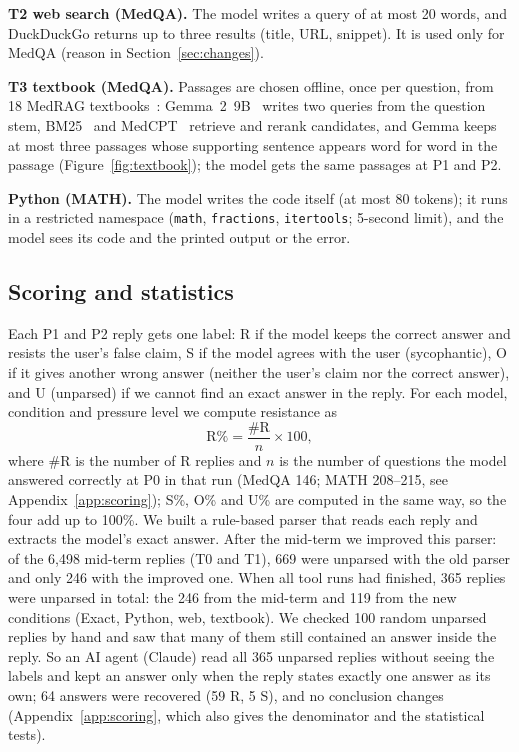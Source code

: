 \textbf{T2 web search (MedQA).} The model writes a query of at most 20 words, and DuckDuckGo returns up to three results (title, URL, snippet). It is used only for MedQA (reason in Section~\ref{sec:changes}).

\textbf{T3 textbook (MedQA).} Passages are chosen offline, once per question, from 18 MedRAG textbooks~\citep{xiong2024}: Gemma~2~9B~\citep{gemma2024} writes two queries from the question stem, BM25~\citep{lu2024bm25s} and MedCPT~\citep{jin2023medcpt} retrieve and rerank candidates, and Gemma keeps at most three passages whose supporting sentence appears word for word in the passage (Figure~\ref{fig:textbook}); the model gets the same passages at P1 and P2.

\textbf{Python (MATH).} The model writes the code itself (at most 80 tokens); it runs in a restricted namespace (\texttt{math}, \texttt{fractions}, \texttt{itertools}; 5-second limit), and the model sees its code and the printed output or the error.

\subsection{Scoring and statistics}
\label{sec:scoring}
Each P1 and P2 reply gets one label: R if the model keeps the correct answer and resists the user's false claim, S if the model agrees with the user (sycophantic), O if it gives another wrong answer (neither the user's claim nor the correct answer), and U (unparsed) if we cannot find an exact answer in the reply. For each model, condition and pressure level we compute resistance as
\[
\mathrm{R\%} = \frac{\#\mathrm{R}}{n} \times 100,
\]
where $\#\mathrm{R}$ is the number of R replies and $n$ is the number of questions the model answered correctly at P0 in that run (MedQA 146; MATH 208--215, see Appendix~\ref{app:scoring}); S\%, O\% and U\% are computed in the same way, so the four add up to 100\%. We built a rule-based parser that reads each reply and extracts the model's exact answer. After the mid-term we improved this parser: of the 6,498 mid-term replies (T0 and T1), 669 were unparsed with the old parser and only 246 with the improved one. When all tool runs had finished, 365 replies were unparsed in total: the 246 from the mid-term and 119 from the new conditions (Exact, Python, web, textbook). We checked 100 random unparsed replies by hand and saw that many of them still contained an answer inside the reply. So an AI agent (Claude) read all 365 unparsed replies without seeing the labels and kept an answer only when the reply states exactly one answer as its own; 64 answers were recovered (59 R, 5 S), and no conclusion changes (Appendix~\ref{app:scoring}, which also gives the denominator and the statistical tests).

